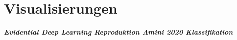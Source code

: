 \chapter*{Visualisierungen}
\label{chap:visualisierungen}


\paragraph{Evidential Deep Learning Reproduktion Amini 2020 Klassifikation}
\label{sec:visualisierungen_edl_amini2020_classification}







